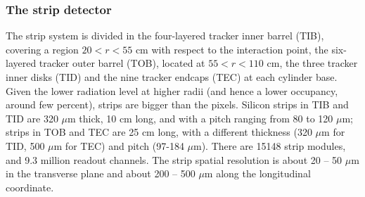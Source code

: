 \subsubsection{The strip detector}
The strip system is divided in the four-layered tracker inner barrel (TIB), covering a region $20 < r < 55$ cm with respect to the interaction point, the six-layered tracker outer barrel (TOB), located at $55 < r < 110$ cm, the three tracker inner disks (TID) and the nine tracker endcaps (TEC) at each cylinder base. Given the lower radiation level at higher radii (and hence a lower occupancy, around few percent), strips are bigger than the pixels. Silicon strips in TIB and TID are 320 $\mu$m thick, 10 cm long, and with a pitch ranging from 80 to 120 $\mu$m; strips in TOB and TEC are 25 cm long, with a different thickness (320 $\mu$m for TID, 500 $\mu$m for TEC) and pitch (97-184 $\mu$m). There are 15148 strip modules, and 9.3 million readout channels. The strip spatial resolution is about 20 -- 50 $\mu$m in the transverse plane and about 200 -- 500 $\mu$m along the longitudinal coordinate.

